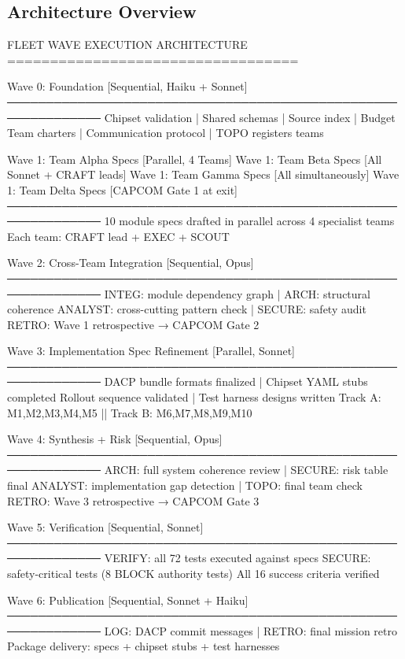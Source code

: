 \documentclass[11pt,letterpaper]{article}
\begin{document}
\subsection{Architecture Overview}

\begin{asciibox}
FLEET WAVE EXECUTION ARCHITECTURE
==================================

  Wave 0: Foundation               [Sequential, Haiku + Sonnet]
  ──────────────────────────────────────────────────────────────
  Chipset validation | Shared schemas | Source index | Budget
  Team charters | Communication protocol | TOPO registers teams

  Wave 1: Team Alpha Specs         [Parallel, 4 Teams]
  Wave 1: Team Beta Specs          [All Sonnet + CRAFT leads]
  Wave 1: Team Gamma Specs         [All simultaneously]
  Wave 1: Team Delta Specs         [CAPCOM Gate 1 at exit]
  ──────────────────────────────────────────────────────────────
  10 module specs drafted in parallel across 4 specialist teams
  Each team: CRAFT lead + EXEC + SCOUT

  Wave 2: Cross-Team Integration   [Sequential, Opus]
  ──────────────────────────────────────────────────────────────
  INTEG: module dependency graph | ARCH: structural coherence
  ANALYST: cross-cutting pattern check | SECURE: safety audit
  RETRO: Wave 1 retrospective  →  CAPCOM Gate 2

  Wave 3: Implementation Spec Refinement [Parallel, Sonnet]
  ──────────────────────────────────────────────────────────────
  DACP bundle formats finalized | Chipset YAML stubs completed
  Rollout sequence validated | Test harness designs written
  Track A: M1,M2,M3,M4,M5  ||  Track B: M6,M7,M8,M9,M10

  Wave 4: Synthesis + Risk         [Sequential, Opus]
  ──────────────────────────────────────────────────────────────
  ARCH: full system coherence review | SECURE: risk table final
  ANALYST: implementation gap detection | TOPO: final team check
  RETRO: Wave 3 retrospective  →  CAPCOM Gate 3

  Wave 5: Verification             [Sequential, Sonnet]
  ──────────────────────────────────────────────────────────────
  VERIFY: all 72 tests executed against specs
  SECURE: safety-critical tests (8 BLOCK authority tests)
  All 16 success criteria verified

  Wave 6: Publication              [Sequential, Sonnet + Haiku]
  ──────────────────────────────────────────────────────────────
  LOG: DACP commit messages | RETRO: final mission retro
  Package delivery: specs + chipset stubs + test harnesses
\end{asciibox}
\end{document}
